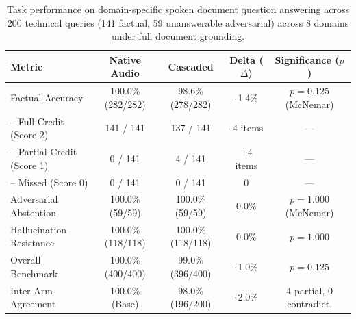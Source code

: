 \begin{table}[t]
\centering
\small
\caption{Task performance on domain-specific spoken document question answering across 200 technical queries (141 factual, 59 unanswerable adversarial) across 8 domains under full document grounding.}
\label{tab:scorecard}
\begin{tabular}{lcccc}
\toprule
\textbf{Metric} & \textbf{Native Audio} & \textbf{Cascaded} & \textbf{Delta ($\Delta$)} & \textbf{Significance ($p$)} \\
\midrule
Factual Accuracy & 100.0\% (282/282) & 98.6\% (278/282) & -1.4\% & $p = 0.125$ (McNemar) \\
-- Full Credit (Score 2) & 141 / 141 & 137 / 141 & -4 items & --- \\
-- Partial Credit (Score 1) & 0 / 141 & 4 / 141 & +4 items & --- \\
-- Missed (Score 0) & 0 / 141 & 0 / 141 & 0 & --- \\
\midrule
Adversarial Abstention & 100.0\% (59/59) & 100.0\% (59/59) & 0.0\% & $p = 1.000$ (McNemar) \\
Hallucination Resistance & 100.0\% (118/118) & 100.0\% (118/118) & 0.0\% & $p = 1.000$ \\
\midrule
Overall Benchmark & 100.0\% (400/400) & 99.0\% (396/400) & -1.0\% & $p = 0.125$ \\
Inter-Arm Agreement & 100.0\% (Base) & 98.0\% (196/200) & -2.0\% & 4 partial, 0 contradict. \\
\bottomrule
\end{tabular}
\end{table}
